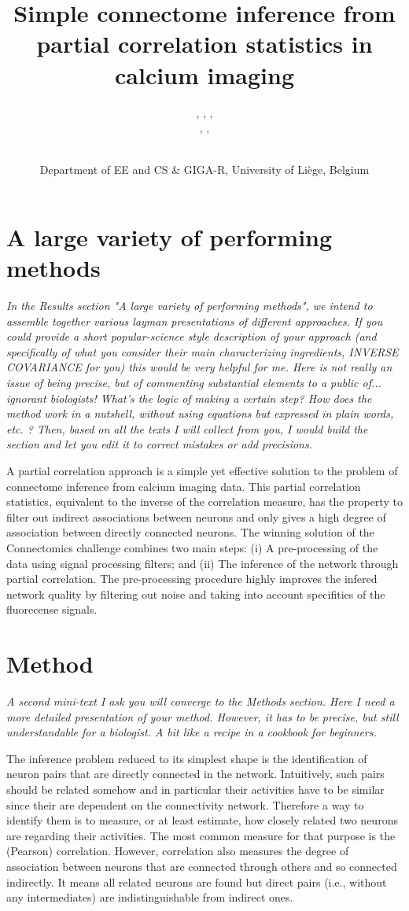 \documentclass[wcp]{jmlr}
\title{Simple connectome inference from partial correlation statistics in calcium imaging}
\author{\Name{Antonio Sutera},
   \Name{Arnaud Joly},
   \Name{Vincent François-Lavet}, \Email{a.sutera@ulg.ac.be}\\
   \Name{Zixiao Aaron Qiu},
   \Name{Gilles Louppe},
   \Name{Damien Ernst}\and\Name{Pierre Geurts}
    \\
   \addr Department of EE and CS \& GIGA-R, University of Li\`ege, Belgium}
\begin{document}
\section{A large variety of performing methods}

\emph{
In the Results section "A large variety of performing methods", we intend to
assemble together various layman presentations of different approaches. If you
could provide a short popular-science style description of your approach (and
specifically of what you consider their main characterizing ingredients,
INVERSE COVARIANCE for you) this would be very helpful for me.  Here is not
really an issue of being precise, but of commenting substantial elements to a
public of... ignorant biologists! What's the logic of making a certain step?
How does the method work in a nutshell, without using equations but expressed
in plain words, etc. ? Then, based on all the texts I will collect from you, I
would build the section and let you edit it to correct mistakes or add
precisions.\\}


A partial correlation approach \cite{sutera2014simple}  is a simple yet
effective solution to the problem of connectome inference from calcium imaging
data. This partial correlation statistics, equivalent to the inverse of the correlation
measure, has  the property to filter out indirect associations between neurons and
only gives a high degree of association between directly connected neurons. The
winning solution of the Connectomics challenge combines two main steps:
(i) A pre-processing of the data using signal processing filters; and (ii)
The inference of the network through partial correlation. The pre-processing procedure
highly improves the infered network quality by filtering out noise and taking into account
specifities of the fluorecense signals.


\section{Method}
\emph{A second mini-text I ask you will converge to the Methods section. Here I need
a more detailed presentation of your method. However, it has to be precise, but
still understandable for a biologist. A bit like a recipe in a cookbook for
beginners.\\}

The inference problem reduced to its simplest shape is the identification of
neuron pairs that are directly connected in the network. Intuitively, such
pairs should be related somehow and in particular their activities have to be
similar since their are dependent on the connectivity network. Therefore a way
to identify them is to measure, or at least estimate, how closely related two
neurons are regarding their activities. The most common measure for that
purpose is the (Pearson) correlation.  However, correlation also measures the
degree of association between neurons that are connected through others and so
connected indirectly. It means all related neurons are found but direct pairs (i.e., without any intermediates)
are indistinguishable from indirect ones.
\end{document}
